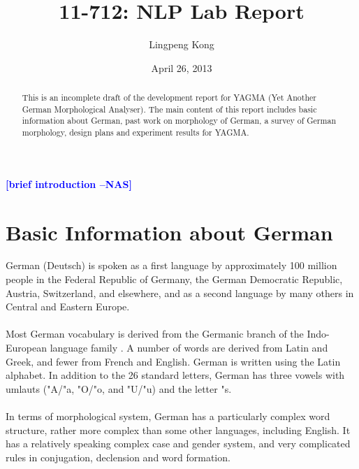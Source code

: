 \documentclass[11pt,letterpaper]{article}
\title{11-712:  NLP Lab Report}
\author{Lingpeng Kong}
\date{April 26, 2013}
\newcommand{\nascomment}[1]{\textcolor{blue}{\textbf{[#1 --NAS]}}}
\begin{document}
\maketitle
\renewcommand{\abstractname}{Abstract}

\begin{abstract}
This is an incomplete draft of the development report for YAGMA (Yet Another German Morphological Analyser). The main content of this report includes basic information about German, past work on morphology of German, a survey of German morphology, design plans and experiment results for YAGMA.
\end{abstract}

\nascomment{brief introduction}

\section{Basic Information about German}
German (Deutsch) is spoken as a first language by approximately 100 million people in the Federal Republic of Germany, the German Democratic Republic, Austria, Switzerland, and elsewhere, and as a second language by many others in Central and Eastern Europe. \citep{fox}\\\\
Most German vocabulary is derived from the Germanic branch of the Indo-European language family \citep{ec}. A number of words are derived from Latin and Greek, and fewer from French and English. German is written using the Latin alphabet. In addition to the 26 standard letters, German has three vowels with umlauts ("A/"a, "O/"o, and "U/"u) and the letter "s.\\\\
In terms of morphological system, German has a particularly complex word structure, rather more complex than some other languages, including English. \citep{fox} It has a relatively speaking complex case and gender system, and very complicated rules in conjugation, declension and word formation.
\end{document}

